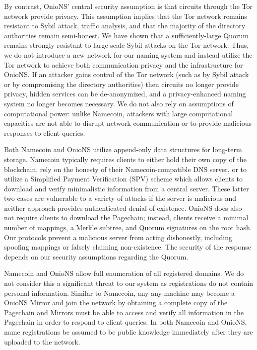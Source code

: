 \documentclass[conference]{IEEEtran}
\begin{document}
By contrast, OnioNS' central security assumption is that circuits through the Tor network provide privacy. This assumption implies that the Tor network remains resistant to Sybil attack, traffic analysis, and that the majority of the directory authorities remain semi-honest. We have shown that a sufficiently-large Quorum remains strongly resistant to large-scale Sybil attacks on the Tor network. Thus, we do not introduce a new network for our naming system and instead utilize the Tor network to achieve both communication privacy and the infrastructure for OnioNS. If an attacker gains control of the Tor network (such as by Sybil attack or by compromising the directory authorities) then circuits no longer provide privacy, hidden services can be de-anonymized, and a privacy-enhanced naming system no longer becomes necessary. We do not also rely on assumptions of computational power: unlike Namecoin, attackers with large computational capacities are not able to disrupt network communication or to provide malicious responses to client queries.

Both Namecoin and OnioNS utilize append-only data structures for long-term storage. Namecoin typically requires clients to either hold their own copy of the blockchain, rely on the honesty of their Namecoin-compatible DNS server, or to utilize a Simplified Payment Verification\cite{nakamoto2008bitcoin} (SPV) scheme which allows clients to download and verify minimalistic information from a central server. These latter two cases are vulnerable to a variety of attacks if the server is malicious and neither approach provides authenticated denial-of-existence. OnioNS does also not require clients to download the Pagechain; instead, clients receive a minimal number of mappings, a Merkle subtree, and Quorum signatures on the root hash. Our protocols prevent a malicious server from acting dishonestly, including spoofing mappings or falsely claiming non-existence. The security of the response depends on our security assumptions regarding the Quorum.

Namecoin and OnioNS allow full enumeration of all registered domains. We do not consider this a significant threat to our system as registrations do not contain personal information. Similar to Namecoin, any any machine may become a OnioNS Mirror and join the network by obtaining a complete copy of the Pagechain and Mirrors must be able to access and verify all information in the Pagechain in order to respond to client queries. In both Namecoin and OnioNS, name registrations be assumed to be public knowledge immediately after they are uploaded to the network.
\end{document}
